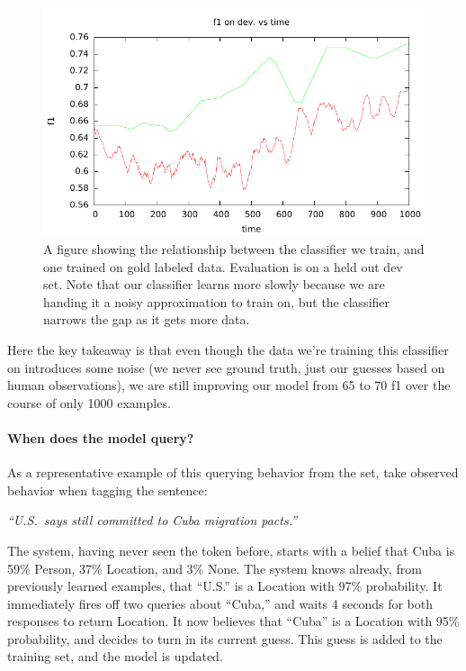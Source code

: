 \begin{figure}[t]
  \begin{centering}
  \includegraphics[width=1.0\textwidth]{figures/ner_2_class/machine_f1_plot/machine_f1_vs_time.pdf}
  \end{centering}
  \caption{A figure showing the relationship between the classifier we train, and one trained on gold labeled data. Evaluation is on a held out dev set. Note that our classifier learns more slowly because we are handing it a noisy approximation to train on, but the classifier narrows the gap as it gets more data.}
\label{fig:ner-dev-f1}
\end{figure}

Here the key takeaway is that even though the data we're training this classifier on introduces some noise (we never see
ground truth, just our guesses based on human observations), we are still improving our model from 65 to 70 f1 over the course
of only 1000 examples.


\paragraph{When does the model query?}

As a representative example of this querying behavior from the set, take observed behavior when tagging the sentence:

\begin{center}
\textit{``U.S.\ says still committed to Cuba migration pacts.''}
\end{center}

The system, having never seen the token before, starts with a belief that Cuba is 59\% Person, 37\% Location, and 3\% None. The system knows already, from previously learned examples, that ``U.S.'' is a Location with 97\% probability. It immediately fires off two queries about ``Cuba,'' and waits 4 seconds for both responses to return Location. It now believes that ``Cuba'' is a Location with 95\% probability, and decides to turn in its current guess. This guess is added to the training set, and the model is updated.


